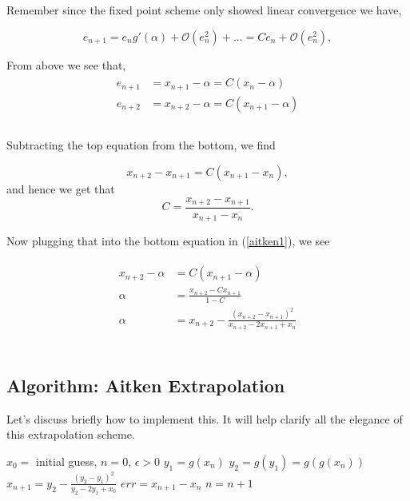 \documentclass[paper=a4, fontsize=11pt]{scrartcl} %
\numberwithin{equation}{section} %
\numberwithin{figure}{section} %
\numberwithin{table}{section} %
\begin{document}
Remember since the fixed point scheme only showed linear convergence we have,

$$e_{n+1} = e_n g'(\alpha) + \mathcal{O}(e_n^2) + ... = C e_n + \mathcal{O}(e_n^2),$$

From above we see that, \\

\begin{align} 
\begin{split}
\label{aitken1}
e_{n+1}&= x_{n+1} - \alpha = C(x_n - \alpha) \\
e_{n+2}&= x_{n+2} - \alpha = C(x_{n+1}-\alpha) \\
\end{split}					
\end{align}\\

Subtracting the top equation from the bottom, we find 

$$x_{n+2}-x_{n+1} = C(x_{n+1}-x_n),$$ and hence we get that $$C = \frac{ x_{n+2}-x_{n+1}     }{   x_{n+1}-x_n    }.$$

Now plugging that into the bottom equation in (\ref{aitken1}), we see

\begin{align} 
\begin{split}
\label{aitken1}
x_{n+2} - \alpha &= C(x_{n+1}-\alpha) \\
\alpha &= \frac{ x_{n+2} - C x_{n+1}  }{ 1 - C  } \\
\alpha &= x_{n+2} - \frac{  (x_{n+2}-x_{n+1})^2   }{ x_{n+2}-2 x_{n+1} + x_{n}  }
\end{split}					
\end{align}\\

\subsection{Algorithm: Aitken Extrapolation}

Let's discuss briefly how to implement this. It will help clarify all the elegance of this extrapolation scheme. 

\begin{algorithmic}
\State $x_0 =$ initial guess, $n=0$, $\epsilon > 0$
\State $y_1 = g(x_n)$
\State $y_2 = g(y_1) = g(g(x_n))$
\State $x_{n+1} = y_2 - \frac{(y_2-y_1)^2}{y_2 - 2 y_1 + x_0}$
\State $err = x_{n+1}-x_{n}$
\State $n=n+1$ 
\EndWhile
\end{algorithmic}
\end{document}
